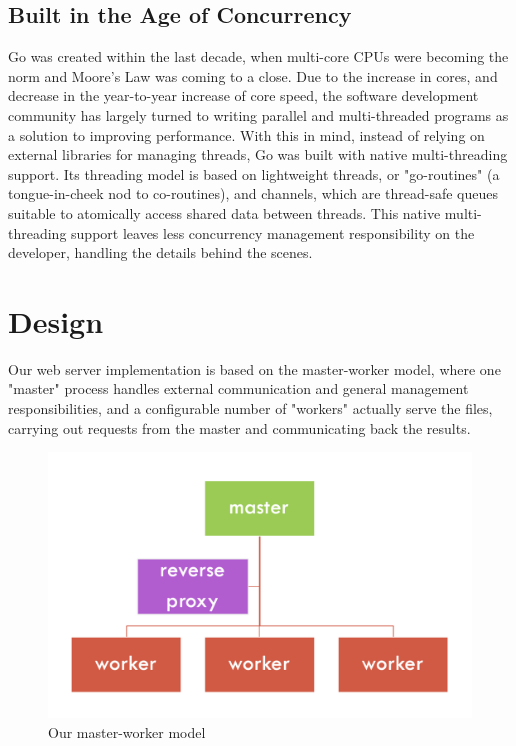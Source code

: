 \documentclass[10pt]{article}
\begin{document}
\begin{multicols}{2}
\subsection*{Built in the Age of Concurrency}
\par
Go was created within the last decade, when multi-core CPUs were becoming the norm and Moore's Law was coming to a close.  Due to the increase in cores, and decrease in the year-to-year increase of core speed, the software development community has largely turned to writing parallel and multi-threaded programs as a solution to improving performance.  With this in mind, instead of relying on external libraries for managing threads, Go was built with native multi-threading support. Its threading model is based on lightweight threads, or "go-routines" (a tongue-in-cheek nod to co-routines), and channels, which are thread-safe queues suitable to atomically access shared data between threads. This native multi-threading support leaves less concurrency management responsibility on the developer, handling the details behind the scenes.
\section*{Design}
\par
Our web server implementation is based on the master-worker model, where one "master" process handles external communication and general management responsibilities, and a configurable number of "workers" actually serve the files, carrying out requests from the master and communicating back the results.
\end{multicols}
\begin{figure}
\centering
        \includegraphics[totalheight=9cm]{./images/masterworker.png}
        \caption{Our master-worker model}
\end{figure}
\end{document}
